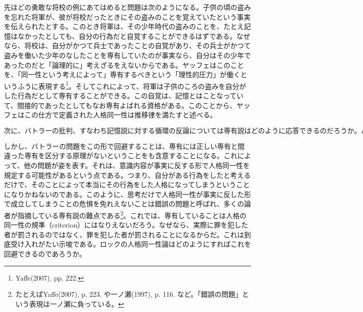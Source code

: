 \documentclass[a4j,oneside]{jsbook}
\begin{document}
\par
先ほどの勇敢な将校の例にあてはめると問題は次のようになる。子供の頃の盗みを忘れた将軍が、彼が将校だったときにその盗みのことを覚えていたという事実を伝えられたとする。このとき将軍は、その少年時代の盗みのことを、たとえ記憶はなかったとしても、自分の行為だと自覚することができるはずである。なぜなら、将校は、自分がかつて兵士であったことの自覚があり、その兵士がかつて盗みを働いた少年のなしたことを専有していたのが事実なら、自分はその少年であったのだと「論理的に」考えざるをえないからである。ヤッフェはこのことを、「同一性という考えによって」専有するべきという「理性的圧力」が働くというふうに表現する\footnote{Yaffe(2007), pp. 222.}。そしてこれによって、将軍は子供のころの盗みを自分がした行為だとして専有することができる。この自覚は、記憶とはことなっていて、間接的であったとしてもなお専有よばれる資格がある。このことから、ヤッフェはこの仕方で定義された人格同一性は推移律を満たすと述べる。
\par
$
次に、バトラーの批判、すなわち記憶説に対する循環の反論については専有説はどのように応答できるのだろうか。バトラーの批判は、記憶は過去の当人の記憶以外にありえないので、記憶に残っている行為をしたの人格が当人であるとして人格同一性を構成するのは論点先取だというところにあった。これに反論するには、ある人格が、過去に同じ人格が実際にはしなかった行為でも専有しうることが示さればよい。それが言えたならば、専有していることそれ自体に人格同一性が前提されているという批判はあたらなくなるからだ。そして実際、私は過去に私がしなかった行為でも専有しうるは。たとえば、わたしが帰省して久しぶりに親戚に会ったとき、自分が5才のときに、遊園地のパレードに乱入して大騒ぎを起こしたことがあったと複数の人に聞かされたとしたら、そしてその時のことを私は自分が記憶している12才のころ覚えていたと聞かされたならば、私自身にまったくその記憶はなくても、その行為を専有するだろう。そして、その専有はその行為を事実私がしていたかどうかには関係がない。このように、ひとは過去の自分が実際には行っていない行為を自分がしたものとして専有することがありえるため、専有に人格同一性は前提されておらず、よって、循環の批判を免れることになる。
$
\par
しかし、バトラーの問題をこの形で回避することは、専有には正しい専有と間違った専有を区分する原理がないということをも含意することになる。これによって、他の問題が姿を表す。それは、意識内容が事実に反する形で人格同一性を規定する可能性があるという点である。つまり、自分がある行為をしたと考えるだけで、そのことによって本当にその行為をした人格になってしまうということになりかねないのである。このように、思考だけで人格同一性が事実に反した形で成立してしまうことの危惧を免れえないことは錯誤の問題と呼ばれ、多くの論者が指摘している専有説の難点である\footnote{たとえばYaffe(2007), p. 223. や一ノ瀬(1997), p. 116. など。「錯誤の問題」という表現は一ノ瀬に負っている。}。これでは、専有していることは人格の同一性の規準（criterion）にはなりえないだろう。なぜなら、実際に罪を犯した者が罰されるのではなく、罪を犯した者が罰されることになるからだ。これは到底受け入れがたい示唆である。ロックの人格同一性論はどのようにすればこれを回避できるのであろうか。
\end{document}
